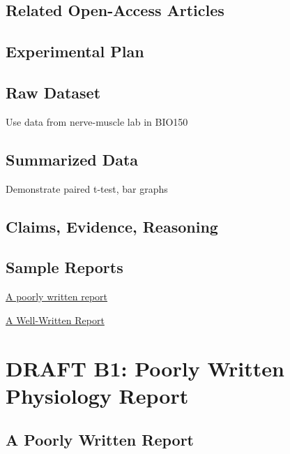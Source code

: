 \documentclass[
]{book}
\begin{document}
\hypertarget{related-open-access-articles-1}{%
\section{Related Open-Access Articles}\label{related-open-access-articles-1}}

\hypertarget{experimental-plan-1}{%
\section{Experimental Plan}\label{experimental-plan-1}}

\hypertarget{raw-dataset-1}{%
\section{Raw Dataset}\label{raw-dataset-1}}

Use data from nerve-muscle lab in BIO150

\hypertarget{summarized-data-1}{%
\section{Summarized Data}\label{summarized-data-1}}

Demonstrate paired t-test, bar graphs

\hypertarget{claims-evidence-reasoning-1}{%
\section{Claims, Evidence, Reasoning}\label{claims-evidence-reasoning-1}}

\hypertarget{sample-reports-1}{%
\section{Sample Reports}\label{sample-reports-1}}

\protect\hyperlink{appb823}{A poorly written report}

\protect\hyperlink{appb825}{A Well-Written Report}

\hypertarget{draft-b1-poorly-written-physiology-report}{%
\chapter*{DRAFT B1: Poorly Written Physiology Report}\label{draft-b1-poorly-written-physiology-report}}

\hypertarget{appb823}{%
\section{A Poorly Written Report}\label{appb823}}
\end{document}
